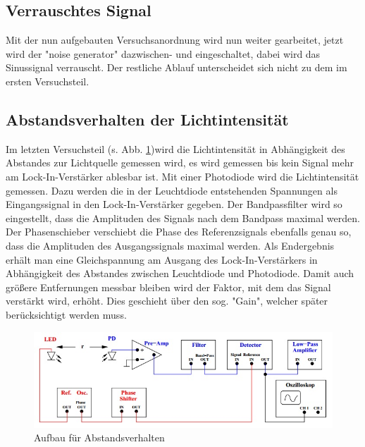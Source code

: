 \subsection{Verrauschtes Signal}

Mit der nun aufgebauten Versuchsanordnung wird nun weiter gearbeitet,
jetzt wird der "noise generator" dazwischen- und eingeschaltet, dabei wird das Sinussignal verrauscht. Der restliche Ablauf unterscheidet sich nicht zu dem im ersten Versuchsteil.

\subsection{Abstandsverhalten der Lichtintensität}

Im letzten Versuchsteil (s. Abb. \ref{fig:Aufbau2})wird die Lichtintensität in Abhängigkeit des Abstandes zur Lichtquelle gemessen wird, es wird gemessen bis kein Signal mehr am Lock-In-Verstärker ablesbar ist. Mit einer Photodiode wird die Lichtintensität gemessen. Dazu werden die in der Leuchtdiode entstehenden Spannungen als Eingangssignal in den Lock-In-Verstärker gegeben. Der Bandpassfilter wird so eingestellt, dass die Amplituden des Signals nach dem Bandpass maximal werden. Der Phasenschieber verschiebt die Phase des Referenzsignals ebenfalls genau so, dass die Amplituden des Ausgangssignals maximal werden. Als Endergebnis erhält man eine Gleichspannung am Ausgang des Lock-In-Verstärkers in Abhängigkeit des Abstandes zwischen Leuchtdiode und Photodiode. Damit auch größere Entfernungen messbar bleiben wird der Faktor, mit dem das Signal verstärkt wird, erhöht. Dies geschieht über den sog. "Gain", welcher später berücksichtigt werden muss.



\begin{figure}[h]
	\centering
	\includegraphics[scale=0.8]{Grafiken/V303Aufbau2.jpg}
	\caption{Aufbau für Abstandsverhalten}
	\label{fig:Aufbau2}
\end{figure}
